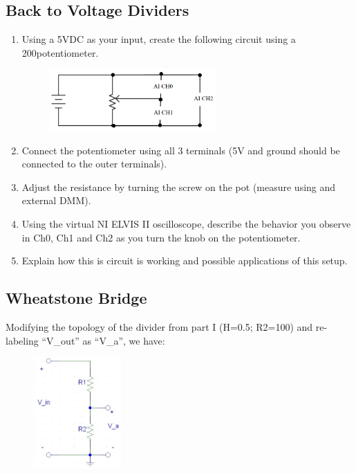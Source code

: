 \documentclass{article}
\begin{document}
\subsection*{Back to Voltage Dividers}
\begin{enumerate}
	\item Using a 5VDC as your input, create the following circuit using a 200\textOmega potentiometer.
 		\begin{figure}[h!]
    	\includegraphics[width=0.6\textwidth]{lab_1_fig_6.png}
    	\centering
		\end{figure}
	\item Connect the potentiometer using all 3 terminals (5V and ground should be connected to the outer terminals).
	\item Adjust the resistance by turning the screw on the pot (measure using and external DMM).
	\item Using the virtual NI ELVIS II oscilloscope, describe the behavior you observe in Ch0, Ch1 and Ch2 as you turn the knob on the potentiometer.
	\item Explain how this is circuit is working and possible applications of this setup.
\end{enumerate}

\subsection*{Wheatstone Bridge}
Modifying the topology of the divider from part I (H=0.5; R2=100\textOmega) and re-labeling “V\_out” as “V\_a”, we have:

\begin{figure}[h!]
    	\includegraphics[width=0.3\textwidth]{lab_1_fig_7.jpg}
    	\centering
		\end{figure}
\end{document}
